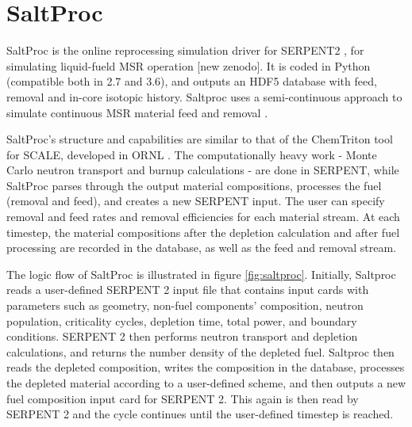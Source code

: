 \section{SaltProc}

SaltProc is the online reprocessing simulation
driver for SERPENT2 \cite{leppanen_serpent-a_2013},
for simulating liquid-fueld \gls{MSR} operation [new zenodo].
It is coded in Python (compatible both in 2.7 and 3.6), and
outputs an HDF5 \cite{the_hierarchical_1997} database
with feed, removal and in-core isotopic history.
Saltproc uses a semi-continuous approach to simulate
continuous \gls{MSR} material feed and removal \cite{rykhlevskii_online_2017}.

SaltProc's structure and capabilities are similar to that of the
ChemTriton tool for SCALE, developed in ORNL \cite{betzler_molten_2017}.
The computationally heavy work - Monte Carlo neutron transport and
burnup calculations - are done in SERPENT, while SaltProc parses through
the output material compositions, processes the fuel (removal and feed),
and creates a new SERPENT input. The user can specify removal and feed
rates and removal efficiencies for each material stream. At each
timestep, the material compositions after the
depletion calculation and after fuel processing are recorded in the
database, as well as the feed and removal stream. 

The logic flow of SaltProc is illustrated in figure \ref{fig:saltproc}.
Initially, Saltproc reads a user-defined SERPENT 2 input file that
contains input cards with parameters such as  geometry, non-fuel components' composition,
neutron population, criticality cycles, depletion time, total power, and boundary conditions.
SERPENT 2 then performs neutron transport and depletion calculations, and 
returns the number density of the depleted fuel. Saltproc then reads the
depleted composition, writes the composition in the database, processes
the depleted material according to a user-defined scheme, and then
outputs a new fuel composition input card for SERPENT 2. This again
is then read by SERPENT 2 and the cycle continues until the user-defined
timestep is reached.

